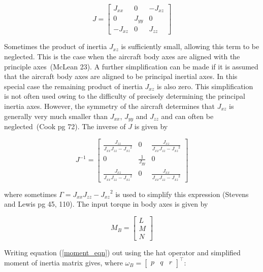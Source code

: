 \begin{equation*}
  J=
  \begin{bmatrix}
    J_{xx} & 0 & -J_{xz} \\
    0 & J_{yy} & 0 \\
    -J_{xz} & 0 & J_{zz}
  \end{bmatrix}
\end{equation*}

Sometimes the product of inertia $J_{xz}$ is sufficiently small, allowing this term to be neglected.
This is the case when the aircraft body axes are aligned with the principle axes\ (McLean 23).
A further simplification can be made if it is assumed that the aircraft body axes are aligned to be principal inertial axes.
In this special case the remaining product of inertia $J_{xz}$ is also zero.
This simplification is not often used owing to the difficulty of precisely determining the principal inertia axes.
However, the symmetry of the aircraft determines that $J_{xz}$ is generally very much smaller than $J_{xx}$, $J_{yy}$ and $J_{zz}$ and can often be neglected\ (Cook pg 72).
The inverse of $J$ is given by

\begin{equation*}
  J^{-1}=
  \begin{bmatrix}
    \frac{J_{zz}}{J_{xx}J_{zz}-{J_{xz}}^{2}} & 0 & \frac{J_{xz}}{J_{xx}J_{zz}-{J_{xz}}^{2}} \\
    0 & \frac{1}{J_{yy}} & 0 \\
    \frac{J_{xz}}{J_{xx}J_{zz}-{J_{xz}}^{2}} & 0 & \frac{J_{xx}}{J_{xx}J_{zz}-{J_{xz}}^{2}}
  \end{bmatrix}
\end{equation*}

where sometimes $\Gamma=J_{xx}J_{zz}-{J_{xz}}^{2}$ is used to simplify this expression (Stevens and Lewis pg 45, 110).
The input torque in body axes is given by

\begin{equation*}
  M_{B}=
  \begin{bmatrix}
    L \\
    M \\
    N
  \end{bmatrix}
\end{equation*}

Writing equation (\ref{moment_eqn}) out using the hat operator and simplified moment of inertia matrix gives, where $\omega_{B}=\begin{bmatrix} p & q & r \end{bmatrix}^{\top}$:

